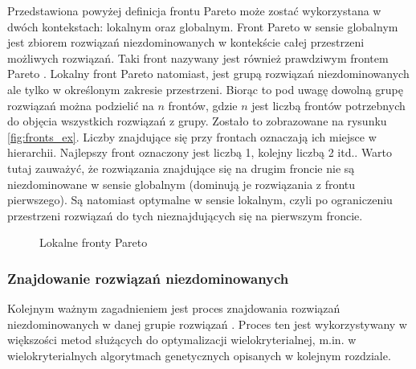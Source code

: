 \documentclass[twoside]{iisthesis}
\begin{document}
Przedstawiona powyżej definicja frontu Pareto może zostać wykorzystana w dwóch kontekstach: lokalnym oraz globalnym. Front Pareto w sensie globalnym jest zbiorem rozwiązań niezdominowanych w kontekście całej przestrzeni możliwych rozwiązań. Taki front nazywany jest również prawdziwym frontem Pareto \cite{book}. Lokalny front Pareto natomiast, jest grupą rozwiązań niezdominowanych ale tylko w określonym zakresie przestrzeni. Biorąc to pod uwagę dowolną grupę rozwiązań można podzielić na $n$ frontów, gdzie $n$ jest liczbą frontów potrzebnych do objęcia wszystkich rozwiązań z grupy. Zostało to zobrazowane na rysunku \eqref{fig:fronts_ex}. Liczby znajdujące się przy frontach oznaczają ich miejsce w hierarchii. Najlepszy front oznaczony jest liczbą 1, kolejny liczbą 2 itd.. Warto tutaj zauważyć, że rozwiązania znajdujące się na drugim froncie nie są niezdominowane w sensie globalnym (dominują je rozwiązania z frontu pierwszego). Są natomiast optymalne w sensie lokalnym, czyli po ograniczeniu przestrzeni rozwiązań do tych nieznajdujących się na pierwszym froncie.
\begin{figure}[!htb]
	\centering
	\caption{Lokalne fronty Pareto}
	\label{fig:fronts_ex}
\end{figure}
\subsubsection{Znajdowanie rozwiązań niezdominowanych}
Kolejnym ważnym zagadnieniem jest proces znajdowania rozwiązań niezdominowanych w danej grupie rozwiązań \cite{book}. Proces ten jest wykorzystywany w większości metod służących do optymalizacji wielokryterialnej, m.in. w wielokryterialnych algorytmach genetycznych opisanych w kolejnym rozdziale.
\end{document}
